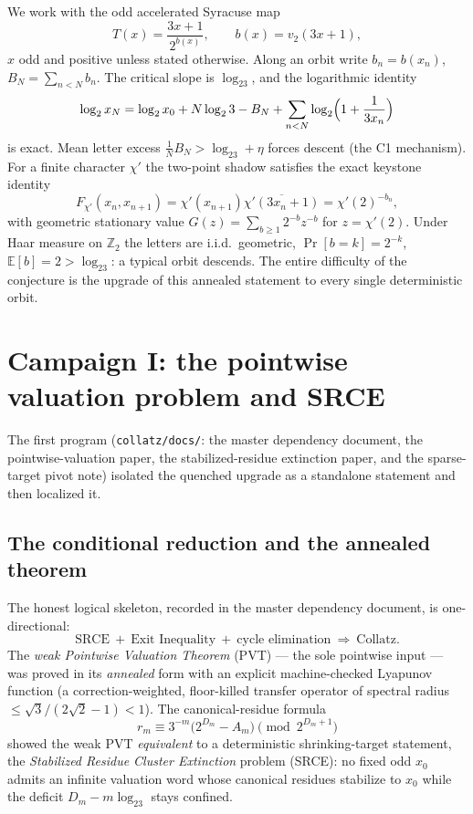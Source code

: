 \documentclass[11pt]{article}
\newcommand{\Z}{\mathbb Z}
\newcommand{\E}{\mathbb E}
\newcommand{\vt}{v_2}
\begin{document}
We work with the odd accelerated Syracuse map
\[
  T(x)=\frac{3x+1}{2^{b(x)}},
  \qquad b(x)=\vt(3x+1),
\]
$x$ odd and positive unless stated otherwise.  Along an orbit write
$b_n=b(x_n)$, $B_N=\sum_{n<N}b_n$.  The critical slope is $\log_23$,
and the logarithmic identity
\begin{equation}\label{eq:log-identity}
  \log_2 x_{N}
  =
  \log_2 x_0
  +N\log_2 3-B_N
  +\sum_{n<N}\log_2\Bigl(1+\frac{1}{3x_n}\Bigr)
\end{equation}
is exact.  Mean letter excess $\frac1NB_N>\log_23+\eta$ forces descent
(the C1 mechanism).  For a finite character $\chi'$ the two-point
shadow satisfies the exact keystone identity
\begin{equation}\label{eq:shadow-letter}
  F_{\chi'}(x_n,x_{n+1})=\chi'(x_{n+1})\overline{\chi'(3x_n+1)}
  =\chi'(2)^{-b_n},
\end{equation}
with geometric stationary value
$G(z)=\sum_{b\ge1}2^{-b}z^{-b}$ for $z=\chi'(2)$.
Under Haar measure on $\Z_2$ the letters are i.i.d.\ geometric,
$\Pr[b=k]=2^{-k}$, $\E[b]=2>\log_23$: a typical orbit descends.  The
entire difficulty of the conjecture is the upgrade of this annealed
statement to every single deterministic orbit.

\section{Campaign I: the pointwise valuation problem and SRCE}

The first program (\texttt{collatz/docs/}: the master dependency
document, the pointwise-valuation paper, the stabilized-residue
extinction paper, and the sparse-target pivot note) isolated the
quenched upgrade as a standalone statement and then localized it.

\subsection{The conditional reduction and the annealed theorem}
The honest logical skeleton, recorded in the master dependency
document, is one-directional:
\[
  \mathrm{SRCE}\ +\ \text{Exit Inequality}\ +\ \text{cycle elimination}
  \ \Longrightarrow\ \text{Collatz}.
\]
The \emph{weak Pointwise Valuation Theorem} (PVT) --- the sole
pointwise input --- was proved in its \emph{annealed} form with an
explicit machine-checked Lyapunov function (a correction-weighted,
floor-killed transfer operator of spectral radius
$\le\sqrt3/(2\sqrt2-1)<1$).  The canonical-residue formula
\[
  r_m\equiv 3^{-m}\bigl(2^{D_m}-A_m\bigr)\pmod{2^{D_m+1}}
\]
showed the weak PVT \emph{equivalent} to a deterministic
shrinking-target statement, the \emph{Stabilized Residue Cluster
Extinction} problem (SRCE): no fixed odd $x_0$ admits an infinite
valuation word whose canonical residues stabilize to $x_0$ while the
deficit $D_m-m\log_23$ stays confined.
\end{document}
